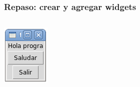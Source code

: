 \documentclass[12pt]{beamer}
\begin{document}
  \begin{frame}
    \label{repaso-crear-widgets}
    \frametitle{Repaso: crear y agregar widgets}
    \begin{columns}[B]
        \footnotesize
        
        \vfill
        \includegraphics[width=\textwidth]{programas/tkinter/capturas/04.png}
    \end{columns}
  \end{frame}
\end{document}
